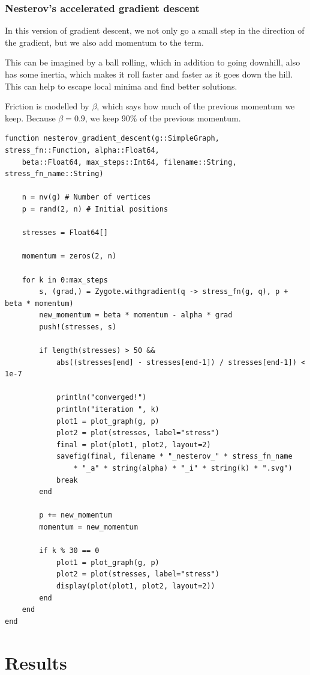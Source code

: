 \documentclass[12pt]{article}
\begin{document}
\subsubsection{Nesterov's accelerated gradient descent}

In this version of gradient descent, we not only go a small step in the direction of the gradient, but we also add momentum to the term.

This can be imagined by a ball rolling, which in addition to going downhill, also has some inertia, which makes it roll
faster and faster as it goes down the hill. This can help to escape local minima and find better solutions.

Friction is modelled by $\beta$, which says how much of the previous momentum we keep. Because $\beta = 0.9$, we keep 90\% of the previous momentum.

\begin{verbatim}
function nesterov_gradient_descent(g::SimpleGraph, stress_fn::Function, alpha::Float64,
    beta::Float64, max_steps::Int64, filename::String, stress_fn_name::String)

    n = nv(g) # Number of vertices
    p = rand(2, n) # Initial positions

    stresses = Float64[]

    momentum = zeros(2, n)

    for k in 0:max_steps
        s, (grad,) = Zygote.withgradient(q -> stress_fn(g, q), p + beta * momentum)
        new_momentum = beta * momentum - alpha * grad
        push!(stresses, s)

        if length(stresses) > 50 &&
            abs((stresses[end] - stresses[end-1]) / stresses[end-1]) < 1e-7

            println("converged!")
            println("iteration ", k)
            plot1 = plot_graph(g, p)
            plot2 = plot(stresses, label="stress")
            final = plot(plot1, plot2, layout=2)
            savefig(final, filename * "_nesterov_" * stress_fn_name
                * "_a" * string(alpha) * "_i" * string(k) * ".svg")
            break
        end

        p += new_momentum
        momentum = new_momentum

        if k % 30 == 0
            plot1 = plot_graph(g, p)
            plot2 = plot(stresses, label="stress")
            display(plot(plot1, plot2, layout=2))
        end
    end
end
\end{verbatim}

\section{Results}
\end{document}
